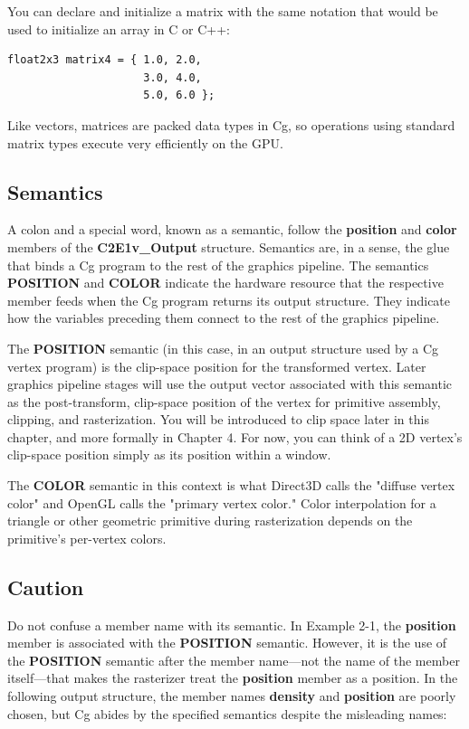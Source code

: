 \documentclass{book}
\begin{document}
You can declare and initialize a matrix with the same notation that would be used to initialize an array in C or C++:

\FloatBarrier
\begin{lstlisting}
float2x3 matrix4 = { 1.0, 2.0,
                     3.0, 4.0,
                     5.0, 6.0 };
\end{lstlisting}
\FloatBarrier

Like vectors, matrices are packed data types in Cg, so operations using standard matrix types execute very efficiently on the GPU.

\subsection{Semantics}

A colon and a special word, known as a semantic, follow the \textbf{position} and \textbf{color} members of the \textbf{C2E1v\_Output} structure. Semantics are, in a sense, the glue that binds a Cg program to the rest of the graphics pipeline. The semantics \textbf{POSITION} and \textbf{COLOR} indicate the hardware resource that the respective member feeds when the Cg program returns its output structure. They indicate how the variables preceding them connect to the rest of the graphics pipeline.

The \textbf{POSITION} semantic (in this case, in an output structure used by a Cg vertex program) is the clip-space position for the transformed vertex. Later graphics pipeline stages will use the output vector associated with this semantic as the post-transform, clip-space position of the vertex for primitive assembly, clipping, and rasterization. You will be introduced to clip space later in this chapter, and more formally in Chapter 4. For now, you can think of a 2D vertex's clip-space position simply as its position within a window.

The \textbf{COLOR} semantic in this context is what Direct3D calls the "diffuse vertex color" and OpenGL calls the "primary vertex color." Color interpolation for a triangle or other geometric primitive during rasterization depends on the primitive's per-vertex colors.

\subsection*{Caution}

Do not confuse a member name with its semantic. In Example 2-1, the \textbf{position} member is associated with the \textbf{POSITION} semantic. However, it is the use of the \textbf{POSITION} semantic after the member name—not the name of the member itself—that makes the rasterizer treat the \textbf{position} member as a position. In the following output structure, the member names \textbf{density} and \textbf{position} are poorly chosen, but Cg abides by the specified semantics despite the misleading names:
\end{document}
